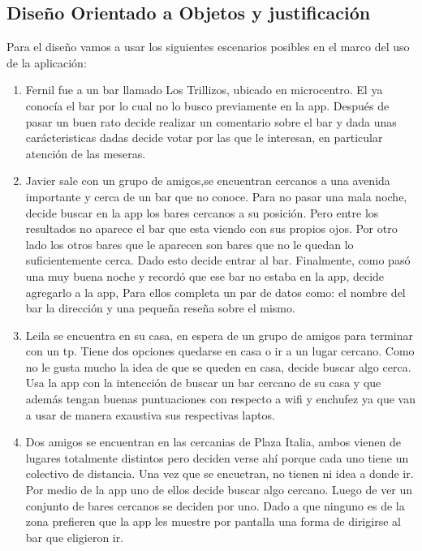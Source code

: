 \subsection{Diseño Orientado a Objetos y justificación}

Para el diseño vamos a usar los siguientes escenarios posibles en el marco del uso de la aplicación:

\begin{enumerate}
\item Fernil fue a un bar llamado Los Trillizos, ubicado en microcentro. El ya conocía el bar por lo cual no lo busco previamente en la app. Después de pasar un buen rato decide realizar un comentario sobre el bar y dada unas carácteristicas dadas decide votar por las que le interesan, en particular atención de las meseras.

\item Javier sale con un grupo de amigos,se encuentran cercanos a una avenida importante y cerca de un bar que no conoce. Para no pasar una mala noche, decide buscar en la app los bares cercanos a su posición. Pero entre los resultados no aparece el bar que esta viendo con sus propios ojos. Por otro lado los otros bares que le aparecen son bares que no le quedan lo suficientemente cerca. Dado esto decide entrar al bar. Finalmente, como pasó una muy buena noche y recordó que ese bar no estaba en la app, decide agregarlo a la app, Para ellos completa un par de datos como: el nombre del bar la dirección y una pequeña reseña sobre el mismo. 

\item Leila se encuentra en su casa, en espera de un grupo de amigos para terminar con un tp. Tiene dos opciones quedarse en casa o ir a un lugar cercano. Como no le gusta mucho la idea de que se queden en casa, decide buscar algo cerca. Usa la app con la intencción de buscar un bar cercano de su casa y que además tengan buenas puntuaciones con respecto a wifi y enchufez ya que van a usar de manera exaustiva sus respectivas laptos.

\item Dos amigos se encuentran en las cercanias de Plaza Italia, ambos vienen de lugares totalmente distintos pero deciden verse ahí porque cada uno tiene un colectivo de distancia. Una vez que se encuetran, no tienen ni idea a donde ir. Por medio de la app uno de ellos decide buscar algo cercano. Luego de ver un conjunto de bares cercanos se deciden por uno. Dado a que ninguno es de la zona prefieren que la app les muestre por pantalla una forma de dirigirse al bar que eligieron ir.


\end{enumerate}
